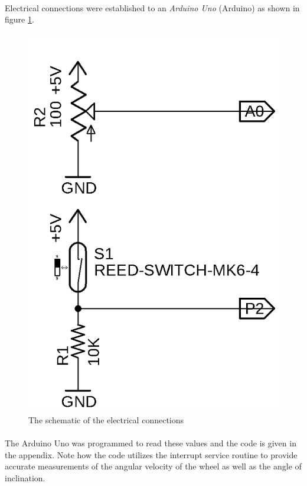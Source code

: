 \documentclass[a4paper]{article}
\begin{document}
\paragraph*{}
Electrical connections were established to an \textit{Arduino Uno} (Arduino) as
shown in figure \ref{fig:arduino-schematic}.

\begin{figure}[ht]
  \centering
  \includegraphics{img/arduino-schematic}
  \caption{The schematic of the electrical connections}
  \label{fig:arduino-schematic}
\end{figure}

\paragraph*{}
The Arduino Uno was programmed to read these values and the code is given in
the appendix. Note how the code utilizes the interrupt service routine to
provide accurate measurements of the angular velocity of the wheel as well as
the angle of inclination.
\end{document}
